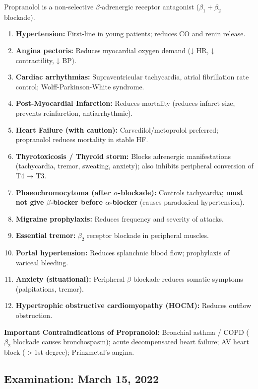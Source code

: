 \documentclass[11pt,a4paper]{article}
\begin{document}
\begin{ansbox}
Propranolol is a non-selective $\beta$-adrenergic receptor antagonist ($\beta_1 + \beta_2$ blockade).
\begin{enumerate}[leftmargin=*]
    \item \textbf{Hypertension:} First-line in young patients; reduces CO and renin release.
    \item \textbf{Angina pectoris:} Reduces myocardial oxygen demand (↓ HR, ↓ contractility, ↓ BP).
    \item \textbf{Cardiac arrhythmias:} Supraventricular tachycardia, atrial fibrillation rate control; Wolff-Parkinson-White syndrome.
    \item \textbf{Post-Myocardial Infarction:} Reduces mortality (reduces infarct size, prevents reinfarction, antiarrhythmic).
    \item \textbf{Heart Failure (with caution):} Carvedilol/metoprolol preferred; propranolol reduces mortality in stable HF.
    \item \textbf{Thyrotoxicosis / Thyroid storm:} Blocks adrenergic manifestations (tachycardia, tremor, sweating, anxiety); also inhibits peripheral conversion of T4 → T3.
    \item \textbf{Phaeochromocytoma (after $\alpha$-blockade):} Controls tachycardia; \textbf{must not give $\beta$-blocker before $\alpha$-blocker} (causes paradoxical hypertension).
    \item \textbf{Migraine prophylaxis:} Reduces frequency and severity of attacks.
    \item \textbf{Essential tremor:} $\beta_2$ receptor blockade in peripheral muscles.
    \item \textbf{Portal hypertension:} Reduces splanchnic blood flow; prophylaxis of variceal bleeding.
    \item \textbf{Anxiety (situational):} Peripheral $\beta$ blockade reduces somatic symptoms (palpitations, tremor).
    \item \textbf{Hypertrophic obstructive cardiomyopathy (HOCM):} Reduces outflow obstruction.
\end{enumerate}

\textbf{Important Contraindications of Propranolol:} Bronchial asthma / COPD ($\beta_2$ blockade causes bronchospasm); acute decompensated heart failure; AV heart block ($>$1st degree); Prinzmetal's angina.
\end{ansbox}

\subsection{Examination: March 15, 2022}
\end{document}
